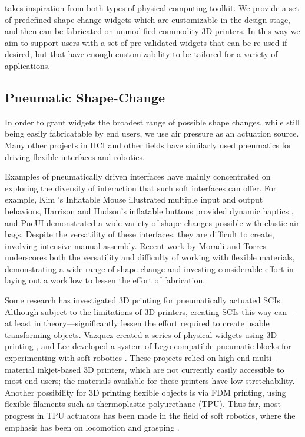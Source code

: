       \mp takes inspiration from both types of physical computing toolkit. We
      provide a set of predefined shape-change widgets which are customizable in
      the design stage, and then can be fabricated on unmodified commodity 3D
      printers. In this way we aim to support users with a set of pre-validated
      widgets that can be re-used if desired, but that have enough
      customizability to be tailored for a variety of applications.
        
    \subsection{Pneumatic Shape-Change}
      In order to grant \mp widgets the broadest range of possible shape
      changes, while still being easily fabricatable by end users, we use air
      pressure as an actuation source. Many other projects in HCI and other
      fields have similarly used pneumatics for driving flexible interfaces and
      robotics.

      Examples of pneumatically driven interfaces have mainly concentrated on
      exploring the diversity of interaction that such soft interfaces can
      offer. For example, Kim \etal's Inflatable Mouse \cite{Kim:2008du}
      illustrated multiple input and output behaviors, Harrison and Hudson's
      inflatable buttons provided dynamic haptics \cite{Harrison:2009}, and
      PneUI \cite{Yao:2013bg} demonstrated a wide variety of shape changes
      possible with elastic air bags. Despite the versatility of these
      interfaces, they are difficult to create, involving intensive manual
      assembly. Recent work by Moradi and Torres \cite{Moradi:2020} underscores
      both the versatility and difficulty of working with flexible materials,
      demonstrating a wide range of shape change and investing considerable
      effort in laying out a workflow to lessen the effort of fabrication.

      Some research has investigated 3D printing for pneumatically actuated
      SCIs. Although subject to the limitations of 3D printers, creating SCIs
      this way can---at least in theory---significantly lessen the effort
      required to create usable transforming objects. Vazquez \etal created a
      series of physical widgets using 3D printing \cite{Vazquez:2015dm}, and
      Lee \etal developed a system of Lego-compatible pneumatic blocks for
      experimenting with soft robotics \cite{Lee:2018}. These projects relied on
      high-end multi-material inkjet-based 3D printers, which are not currently
      easily accessible to most end users; the materials available for these
      printers have low stretchability. Another possibility for 3D printing
      flexible objects is via FDM printing, using flexible filaments such as
      thermoplastic polyurethane (TPU). Thus far, most progress in TPU actuators
      has been made in the field of soft robotics, where the emphasis has been
      on locomotion and grasping \cite{Yap:2016}.
      
